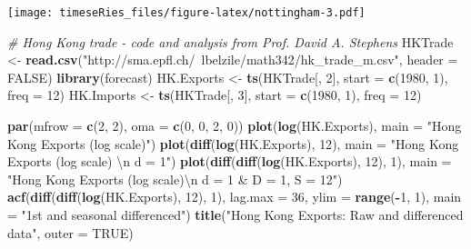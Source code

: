 \documentclass[]{book}
\newenvironment{Shaded}{\begin{snugshade}}{\end{snugshade}}
\newcommand{\CharTok}[1]{\textcolor[rgb]{0.31,0.60,0.02}{#1}}
\newcommand{\CommentTok}[1]{\textcolor[rgb]{0.56,0.35,0.01}{\textit{#1}}}
\newcommand{\DataTypeTok}[1]{\textcolor[rgb]{0.13,0.29,0.53}{#1}}
\newcommand{\DecValTok}[1]{\textcolor[rgb]{0.00,0.00,0.81}{#1}}
\newcommand{\KeywordTok}[1]{\textcolor[rgb]{0.13,0.29,0.53}{\textbf{#1}}}
\newcommand{\NormalTok}[1]{#1}
\newcommand{\OperatorTok}[1]{\textcolor[rgb]{0.81,0.36,0.00}{\textbf{#1}}}
\newcommand{\OtherTok}[1]{\textcolor[rgb]{0.56,0.35,0.01}{#1}}
\newcommand{\StringTok}[1]{\textcolor[rgb]{0.31,0.60,0.02}{#1}}
\begin{document}
\texttt{[image: timeseRies\_files/figure-latex/nottingham-3.pdf]}

\begin{Shaded}
\begin{Highlighting}[]
\CommentTok{# Hong Kong trade - code and analysis from Prof. David A. Stephens}
\NormalTok{HKTrade <-}\StringTok{ }\KeywordTok{read.csv}\NormalTok{(}\StringTok{"http://sma.epfl.ch/~lbelzile/math342/hk_trade_m.csv"}\NormalTok{, }\DataTypeTok{header =} \OtherTok{FALSE}\NormalTok{)}
\KeywordTok{library}\NormalTok{(forecast)}
\NormalTok{HK.Exports <-}\StringTok{ }\KeywordTok{ts}\NormalTok{(HKTrade[, }\DecValTok{2}\NormalTok{], }\DataTypeTok{start =} \KeywordTok{c}\NormalTok{(}\DecValTok{1980}\NormalTok{, }\DecValTok{1}\NormalTok{), }\DataTypeTok{freq =} \DecValTok{12}\NormalTok{)}
\NormalTok{HK.Imports <-}\StringTok{ }\KeywordTok{ts}\NormalTok{(HKTrade[, }\DecValTok{3}\NormalTok{], }\DataTypeTok{start =} \KeywordTok{c}\NormalTok{(}\DecValTok{1980}\NormalTok{, }\DecValTok{1}\NormalTok{), }\DataTypeTok{freq =} \DecValTok{12}\NormalTok{)}

\KeywordTok{par}\NormalTok{(}\DataTypeTok{mfrow =} \KeywordTok{c}\NormalTok{(}\DecValTok{2}\NormalTok{, }\DecValTok{2}\NormalTok{), }\DataTypeTok{oma =} \KeywordTok{c}\NormalTok{(}\DecValTok{0}\NormalTok{, }\DecValTok{0}\NormalTok{, }\DecValTok{2}\NormalTok{, }\DecValTok{0}\NormalTok{))}
\KeywordTok{plot}\NormalTok{(}\KeywordTok{log}\NormalTok{(HK.Exports), }\DataTypeTok{main =} \StringTok{"Hong Kong Exports (log scale)"}\NormalTok{)}
\KeywordTok{plot}\NormalTok{(}\KeywordTok{diff}\NormalTok{(}\KeywordTok{log}\NormalTok{(HK.Exports), }\DecValTok{12}\NormalTok{), }\DataTypeTok{main =} \StringTok{"Hong Kong Exports (log scale) }\CharTok{\textbackslash{}n}\StringTok{ d = 1"}\NormalTok{)}
\KeywordTok{plot}\NormalTok{(}\KeywordTok{diff}\NormalTok{(}\KeywordTok{diff}\NormalTok{(}\KeywordTok{log}\NormalTok{(HK.Exports), }\DecValTok{12}\NormalTok{), }\DecValTok{1}\NormalTok{), }\DataTypeTok{main =} \StringTok{"Hong Kong Exports (log scale)}\CharTok{\textbackslash{}n}\StringTok{ d = 1 & D = 1, S = 12"}\NormalTok{)}
\KeywordTok{acf}\NormalTok{(}\KeywordTok{diff}\NormalTok{(}\KeywordTok{diff}\NormalTok{(}\KeywordTok{log}\NormalTok{(HK.Exports), }\DecValTok{12}\NormalTok{), }\DecValTok{1}\NormalTok{), }\DataTypeTok{lag.max =} \DecValTok{36}\NormalTok{, }\DataTypeTok{ylim =} \KeywordTok{range}\NormalTok{(}\OperatorTok{-}\DecValTok{1}\NormalTok{, }\DecValTok{1}\NormalTok{), }\DataTypeTok{main =} \StringTok{"1st and seasonal differenced"}\NormalTok{)}
\KeywordTok{title}\NormalTok{(}\StringTok{"Hong Kong Exports: Raw and differenced data"}\NormalTok{, }\DataTypeTok{outer =} \OtherTok{TRUE}\NormalTok{)}
\end{Highlighting}
\end{Shaded}
\end{document}

